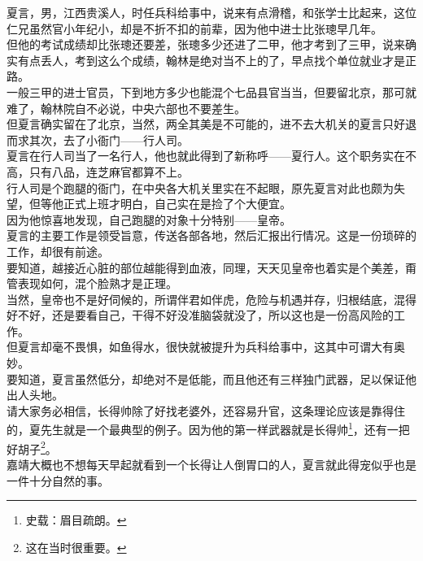 \begin{multicols}{\theparacolNo}
夏言，男，江西贵溪人，时任兵科给事中，说来有点滑稽，和张学士比起来，这位仁兄虽然官小年纪小，却是不折不扣的前辈，因为他中进士比张璁早几年。\\

但他的考试成绩却比张璁还要差，张璁多少还进了二甲，他才考到了三甲，说来确实有点丢人，考到这么个成绩，翰林是绝对当不上的了，早点找个单位就业才是正路。\\

一般三甲的进士官员，下到地方多少也能混个七品县官当当，但要留北京，那可就难了，翰林院自不必说，中央六部也不要差生。\\

但夏言确实留在了北京，当然，两全其美是不可能的，进不去大机关的夏言只好退而求其次，去了小衙门——行人司。\\

夏言在行人司当了一名行人，他也就此得到了新称呼——夏行人。这个职务实在不高，只有八品，连芝麻官都算不上。\\

行人司是个跑腿的衙门，在中央各大机关里实在不起眼，原先夏言对此也颇为失望，但等他正式上班才明白，自己实在是捡了个大便宜。\\

因为他惊喜地发现，自己跑腿的对象十分特别——皇帝。\\

夏言的主要工作是领受旨意，传送各部各地，然后汇报出行情况。这是一份琐碎的工作，却很有前途。\\

要知道，越接近心脏的部位越能得到血液，同理，天天见皇帝也着实是个美差，甭管表现如何，混个脸熟才是正理。\\

当然，皇帝也不是好伺候的，所谓伴君如伴虎，危险与机遇并存，归根结底，混得好不好，还是要看自己，干得不好没准脑袋就没了，所以这也是一份高风险的工作。\\

但夏言却毫不畏惧，如鱼得水，很快就被提升为兵科给事中，这其中可谓大有奥妙。\\

要知道，夏言虽然低分，却绝对不是低能，而且他还有三样独门武器，足以保证他出人头地。\\

请大家务必相信，长得帅除了好找老婆外，还容易升官，这条理论应该是靠得住的，夏先生就是一个最典型的例子。因为他的第一样武器就是长得帅\footnote{史载：眉目疏朗。}，还有一把好胡子\footnote{这在当时很重要。}。\\

嘉靖大概也不想每天早起就看到一个长得让人倒胃口的人，夏言就此得宠似乎也是一件十分自然的事。\\


\end{multicols}
